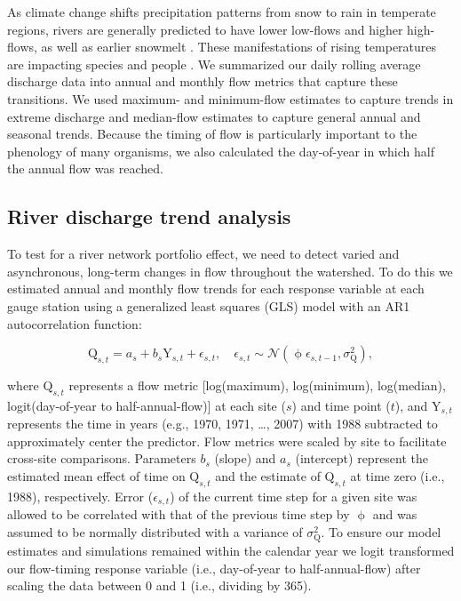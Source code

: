 \documentclass[draft,linenumbers]{AGUJournal}
\begin{document}
	As climate change shifts precipitation patterns from snow to rain in temperate regions, rivers are generally predicted to have lower low-flows and higher high-flows, as well as earlier snowmelt \citep{Nijssen:2001}. These manifestations of rising temperatures are impacting species \citep{Xenopoulos:2006} and people \citep{Hirabayashi:2013}. We summarized our daily rolling average discharge data into annual and monthly flow metrics that capture these transitions. We used maximum- and minimum-flow estimates to capture trends in extreme discharge and median-flow estimates to capture general annual and seasonal trends. Because the timing of flow is particularly important to the phenology of many organisms, we also calculated the day-of-year in which half the annual flow was reached. 

\subsection{River discharge trend analysis}

To test for a river network portfolio effect, we need to detect varied and asynchronous, long-term changes in flow throughout the watershed. To do this we estimated annual and monthly flow trends for each response variable at each gauge station using a generalized least squares (GLS) model with an AR1 autocorrelation function:
\begin{linenomath*}
\begin{equation}
  \mathrm{Q}_{s,t} = a_s + b_s \mathrm{Y}_{s,t} + \epsilon_{s,t}, \quad 
  \epsilon_{s,t} \sim \mathcal{N}(\upphi \epsilon_{s,t-1}, \sigma_\mathrm{Q}^2) \label{eq1},
\end{equation}
\end{linenomath*}
where $\mathrm{Q}_{s,t}$ represents a flow metric [log(maximum), log(minimum), log(median), logit(day-of-year to half-annual-flow)] at each site ($s$) and time point ($t$), and $\mathrm{Y}_{s,t}$ represents the time in years (e.g., 1970, 1971, \ldots, 2007) with 1988 subtracted to approximately center the predictor. Flow metrics were scaled by site to facilitate cross-site comparisons. Parameters $b_{s}$ (slope) and $a_{s}$ (intercept) represent the estimated mean effect of time on $\mathrm{Q}_{s,t}$ and the estimate of $\mathrm{Q}_{s,t}$ at time zero (i.e., 1988), respectively. Error ($\epsilon_{s,t}$) of the current time step for a given site was allowed to be correlated with that of the previous time step by $\upphi$ and was assumed to be normally distributed with a variance of $\sigma_\mathrm{Q}^{2}$. To ensure our model estimates and simulations remained within the calendar year we logit transformed our flow-timing response variable (i.e., day-of-year to half-annual-flow) after scaling the data between 0 and 1 (i.e., dividing by 365).
\end{document}
